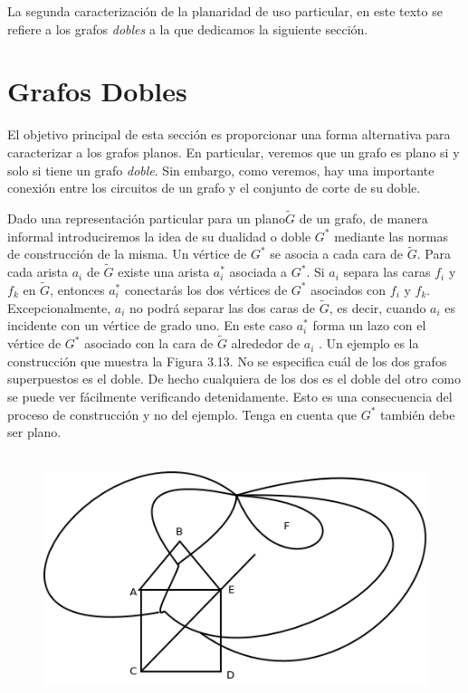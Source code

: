 \documentclass[10pt,a5paper]{book}
\begin{document}
La segunda caracterización de la planaridad de uso particular, en este texto se refiere a los grafos \emph{dobles} a la que dedicamos la siguiente sección.

\section{Grafos Dobles}
El objetivo principal de esta sección es proporcionar una forma alternativa para caracterizar a los grafos planos. En particular, veremos que un grafo es plano si y solo si tiene un grafo \emph{doble}. Sin embargo, como veremos, hay una importante conexión entre los circuitos de un grafo y el conjunto de corte de su doble.

Dado una representación particular para un plano$\widetilde{G}$ de un grafo, de manera informal introduciremos la idea de su dualidad o doble $G^*$ mediante las normas de construcción de la misma. Un vértice de $G^*$ se asocia a cada cara de $\widetilde{G}$. Para cada arista $a_i$ de $\widetilde{G}$ existe una arista $a_i^*$ asociada a $G^*$. Si $a_i$ separa las caras $f_i$ y $f_k$ en $\widetilde{G}$, entonces $a_i^*$ conectarás los dos vértices de $G^*$ asociados con $f_i$ y $f_k$. Excepcionalmente, $a_i$ no podrá separar las dos caras de $\widetilde{G}$, es decir, cuando $a_i$ es incidente con un vértice de grado uno. En este caso $a_i^*$ forma un lazo con el vértice de $G^*$ asociado con la cara de $\widetilde{G}$ alrededor de $a_i$ . Un ejemplo es la construcción que muestra la Figura 3.13. No se especifica cuál de los dos grafos superpuestos es el doble. De hecho cualquiera de los dos es el doble del otro como se puede ver fácilmente verificando detenidamente. Esto es una consecuencia del proceso de construcción y no del ejemplo. Tenga en cuenta que $G^*$ también debe ser plano.
\vfill
\pagebreak
\begin{figure}[H]
\caption{ }
\hrulefill{}\\
\includegraphics[scale=.4]{Fig3_13.png}
\end{figure}
\end{document}
